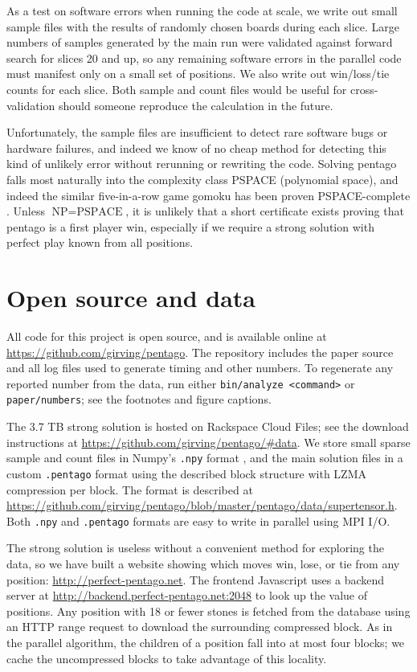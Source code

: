 \documentclass[conference]{IEEEtran}
\begin{document}
As a test on software errors when running the code at scale, we write out small sample files with the
results of randomly chosen boards during each slice.  Large numbers of samples generated by the main run were
validated against forward search for slices 20 and up, so any remaining software errors in the parallel code
must manifest only on a small set of positions.  We also write out win/loss/tie counts for each slice.
Both sample and count files would be useful for cross-validation should someone reproduce the calculation
in the future.

Unfortunately, the sample files are insufficient to detect rare software bugs or hardware failures, and indeed
we know of no cheap method for detecting this kind of unlikely error without rerunning or rewriting the code.
Solving pentago falls most naturally into the complexity class PSPACE (polynomial space), and indeed the similar
five-in-a-row game gomoku has been proven PSPACE-complete \cite{reisch1980gobang}.  Unless
$\textrm{NP}=\textrm{PSPACE}$, it is unlikely that a short certificate exists proving that pentago is
a first player win, especially if we require a strong solution with perfect play known from all positions.

\section{Open source and data}

All code for this project is open source, and is available online at \url{https://github.com/girving/pentago}.
The repository includes the paper source and all log files used to generate timing and other numbers.
To regenerate any reported number from the data, run either
\verb+bin/analyze <command>+ or \verb+paper/numbers+; see the footnotes and figure captions.

The 3.7 TB strong solution is hosted on Rackspace Cloud Files; see the download instructions at
\url{https://github.com/girving/pentago/#data}.  We store small sparse sample and count files in
Numpy's \verb+.npy+ format \cite{kern2007npy}, and the main solution files in a custom \verb+.pentago+ format
using the described block structure with LZMA compression per block.  The format is described
at \url{https://github.com/girving/pentago/blob/master/pentago/data/supertensor.h}.  Both \verb+.npy+ and
\verb+.pentago+ formats are easy to write in parallel using MPI I/O.

The strong solution is useless without a convenient method for exploring the data, so we have built a website
showing which moves win, lose, or tie from any position: \url{http://perfect-pentago.net}.  The frontend
Javascript uses a backend server at \url{http://backend.perfect-pentago.net:2048} to look up the value of
positions.  Any position with 18 or fewer stones is fetched from the database using an HTTP range request
to download the surrounding compressed block.  As in the parallel algorithm, the children of a position
fall into at most four blocks; we cache the uncompressed blocks to take advantage of this locality.
\end{document}
